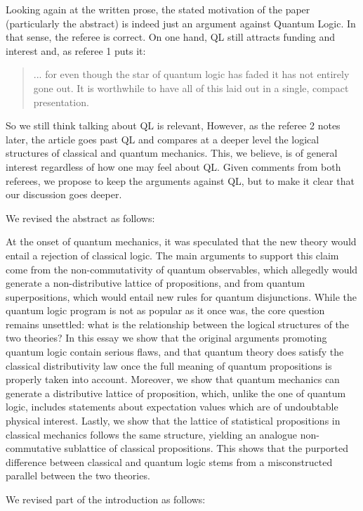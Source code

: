 \documentclass[11pt]{article}
\newcommand\change[1]{{\color{red!75!black} #1}}
\begin{document}
Looking again at the written prose, the stated motivation of the paper (particularly the abstract) is indeed just an argument against Quantum Logic. In that sense, the referee is correct. On one hand, QL still attracts funding and interest and, as referee 1 puts it:
\begin{quote}
	... for even though the star of quantum logic has faded it has not entirely gone out. It is worthwhile to have all of this laid out in a single, compact presentation.
\end{quote}
So we still think talking about QL is relevant, However, as the referee 2 notes later, the article goes past QL and compares at a deeper level the logical structures of classical and quantum mechanics. This, we believe, is of general interest regardless of how one may feel about QL. Given  comments from both referees, we propose to keep the arguments against QL, but to make it clear that our discussion goes deeper.

We revised the abstract as follows:

\change{At the onset of quantum mechanics, it was speculated that the new theory would entail a rejection of classical logic. The main arguments to support this claim come from the non-commutativity of quantum observables, which allegedly would generate a non-distributive lattice of propositions, and from quantum superpositions, which would entail new rules for quantum disjunctions. While the quantum logic program is not as popular as it once was, the core question remains unsettled: what is the relationship between the logical structures of the two theories? In this essay we show that the original arguments promoting quantum logic contain serious flaws, and that quantum theory does satisfy the classical distributivity law once the full meaning of quantum propositions is properly taken into account. Moreover, we show that quantum mechanics can generate a distributive lattice of proposition, which, unlike the one of quantum logic, includes statements about expectation values which are of undoubtable physical interest. Lastly, we show that the lattice of statistical propositions in classical mechanics follows the same structure, yielding an analogue non-commutative sublattice of classical propositions. This shows that the purported difference between classical and quantum logic stems from a misconstructed parallel between the two theories.}

We revised part of the introduction as follows:
\end{document}
